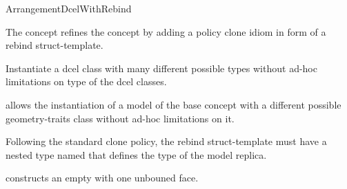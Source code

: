 \ccRefPageBegin

\begin{ccRefConcept}{ArrangementDcelWithRebind}

\ccDefinition

The concept \ccRefName{} refines the  concept by adding
a policy clone idiom in form of a rebind struct-template.

Instantiate a dcel{} class with many different possible types without ad-hoc limitations on type of the dcel classes.

\ccRefines
{}

\ccTypes
   {allows the instantiation of a model of the base concept
    with a different possible geometry-traits
   class without ad-hoc limitations on it.

   Following the standard clone policy, the rebind struct-template must
   have a nested type named  that defines the type of the
   model replica.}

\ccCreation
{}
  {constructs an empty \dcel{} with one unbouned face.}

\ccHasModels
  \\
  \\

\end{ccRefConcept}
\ccRefPageEnd
